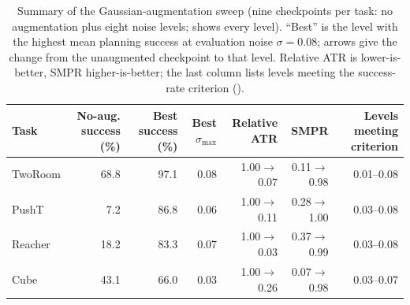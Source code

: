 \begin{table}[t]
\centering
\caption{Summary of the Gaussian-augmentation sweep (nine checkpoints per task: no augmentation plus eight noise levels;  shows every level). ``Best'' is the level with the highest mean planning success at evaluation noise $\sigma=0.08$; arrows give the change from the unaugmented checkpoint to that level. Relative ATR is lower-is-better, SMPR higher-is-better; the last column lists levels meeting the success-rate criterion ().}
\label{tab:full-sweep-compact}
\footnotesize
\setlength{\tabcolsep}{3.5pt}
\begin{tabular}{lrrrrrr}
\toprule
Task & No-aug. success (\%) & Best success (\%) & Best $\sigma_{\max}$ & Relative ATR & SMPR & Levels meeting criterion \\
\midrule
TwoRoom & 68.8 & 97.1 & 0.08 & 1.00$\to$0.07 & 0.11$\to$0.98 & 0.01--0.08 \\
PushT & 7.2 & 86.8 & 0.06 & 1.00$\to$0.11 & 0.28$\to$1.00 & 0.03--0.08 \\
Reacher & 18.2 & 83.3 & 0.07 & 1.00$\to$0.03 & 0.37$\to$0.99 & 0.03--0.08 \\
Cube & 43.1 & 66.0 & 0.03 & 1.00$\to$0.26 & 0.07$\to$0.98 & 0.03--0.07 \\
\bottomrule
\end{tabular}
\end{table}
